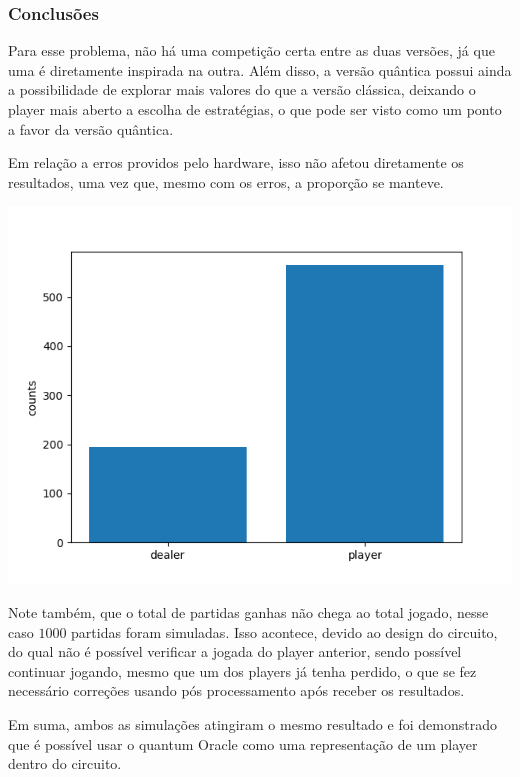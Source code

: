 \documentclass{article}
\begin{document}
\subsubsection{Conclusões}

Para esse problema, não há uma competição certa entre as duas versões, já que uma é diretamente inspirada na outra. Além disso, a versão quântica possui ainda a possibilidade de explorar mais valores do que a versão clássica, deixando o player mais aberto a escolha de estratégias, o que pode ser visto como um ponto a favor da versão quântica.

Em relação a erros providos pelo hardware, isso não afetou diretamente os resultados, uma vez que, mesmo com os erros, a proporção se manteve.

 \begin{center}
 	\includegraphics[scale=0.6]{final_buckshot_roulette_quantum_optimal_strategy_Fake20QV1.png}
 	\label{fig:bckr-fake-melbourne}
 \end{center}

Note também, que o total de partidas ganhas não chega ao total jogado, nesse caso $1000$ partidas foram simuladas. Isso acontece, devido ao design do circuito, do qual não é possível verificar a jogada do player anterior, sendo possível continuar jogando, mesmo que um dos players já tenha perdido, o que se fez necessário correções usando pós processamento após receber os resultados.

Em suma, ambos as simulações atingiram o mesmo resultado e foi demonstrado que é possível usar o quantum Oracle como uma representação de um player dentro do circuito.
\end{document}
